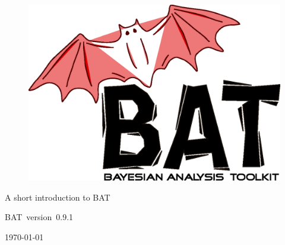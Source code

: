 \documentclass[11pt, a4paper]{article}
\newcommand{\bat}{{\sc BAT}}
\newcommand{\versionno}{0.9.1}
\newcommand{\version}{version~\versionno}
\begin{document}

\thispagestyle{empty}

\begin{figure}
\includegraphics[scale=0.25]{bat.eps}
\end{figure}

\vspace*{1cm}

\begin{center}


{\Large A short introduction to \bat}
\\

\vspace{1cm}

{\large \bat\ \version}

\end{center}

\thispagestyle{empty}

\vfill

\begin{center}
\today
\end{center}

\pagebreak


\thispagestyle{empty}

\enlargethispage{2cm}

\tableofcontents

\pagebreak

\end{document}
